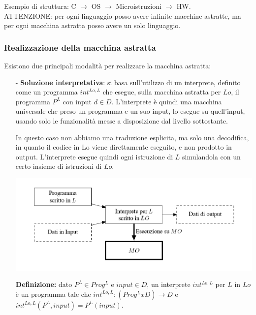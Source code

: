\documentclass[a4paper, 10pt]{report}
\begin{document}
\noindent Esempio di struttura: C $\rightarrow$ OS $\rightarrow$ Microistruzioni $\rightarrow$ HW.\\

\noindent ATTENZIONE: per ogni linguaggio posso avere infinite macchine astratte, ma per ogni macchina astratta posso avere un solo linguaggio.

\subsubsection*{Realizzazione della macchina astratta}

Esistono due principali modalità per realizzare la macchina astratta:

\begin{itemize}
\item[-] \textbf{Soluzione interpretativa}: si basa sull'utilizzo di un interprete, definito come un programma $int^{Lo,L}$ che esegue, sulla macchina astratta per $Lo$, il programma $P^L$ con input $d\in D$. L'interprete è quindi una macchina universale che preso un programma e un suo input, lo esegue su quell'input, usando solo le funzionalità messe a disposizione dal livello sottostante.

In questo caso non abbiamo una traduzione esplicita, ma solo una decodifica,  in quanto  il  codice  in  Lo  viene  direttamente  eseguito,  e  non prodotto  in  output. L’interprete  esegue  quindi ogni istruzione   di   $L$  simulandola   con   un   certo   insieme   di istruzioni   di   $Lo$.

\begin{center}
\includegraphics[scale=1.5]{interprete.pdf}
\end{center}

\noindent \textbf{Definizione:} dato $P^L \in Prog^L$ e $input \in D$, un interprete $int^{Lo, L}$ per $L$ in $Lo$ è un programma tale che $int ^{Lo, L} : (Prog^L x D) \rightarrow D$ e $int ^{Lo, L}(P^L, input) = P^L(input)$.\\


\end{itemize}
\end{document}
